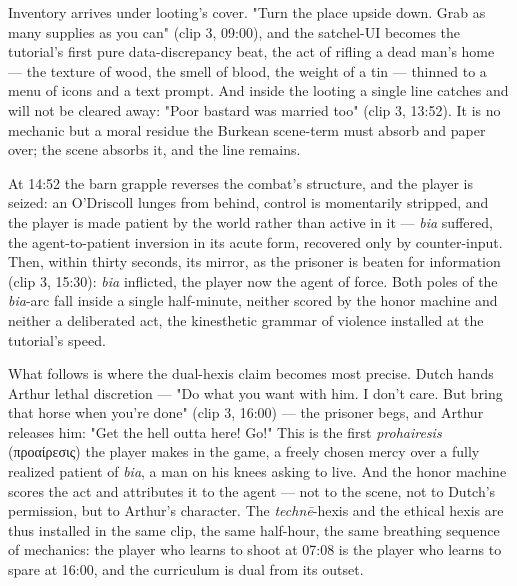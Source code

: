 \documentclass{article}
\newcommand{\gk}[1]{{\greekfont #1}}
\begin{document}
Inventory arrives under looting's cover. "Turn the place upside down. Grab as many supplies as you can" (clip 3, 09:00), and the satchel-UI becomes the tutorial's first pure data-discrepancy beat, the act of rifling a dead man's home — the texture of wood, the smell of blood, the weight of a tin — thinned to a menu of icons and a text prompt. And inside the looting a single line catches and will not be cleared away: "Poor bastard was married too" (clip 3, 13:52). It is no mechanic but a moral residue the Burkean scene-term must absorb and paper over; the scene absorbs it, and the line remains.

At 14:52 the barn grapple reverses the combat's structure, and the player is seized: an O'Driscoll lunges from behind, control is momentarily stripped, and the player is made patient by the world rather than active in it — \textit{bia} suffered, the agent-to-patient inversion in its acute form, recovered only by counter-input. Then, within thirty seconds, its mirror, as the prisoner is beaten for information (clip 3, 15:30): \textit{bia} inflicted, the player now the agent of force. Both poles of the \textit{bia}-arc fall inside a single half-minute, neither scored by the honor machine and neither a deliberated act, the kinesthetic grammar of violence installed at the tutorial's speed.

What follows is where the dual-hexis claim becomes most precise. Dutch hands Arthur lethal discretion — "Do what you want with him. I don't care. But bring that horse when you're done" (clip 3, 16:00) — the prisoner begs, and Arthur releases him: "Get the hell outta here! Go!" This is the first \textit{prohairesis} (\gk{προαίρεσις}) the player makes in the game, a freely chosen mercy over a fully realized patient of \textit{bia}, a man on his knees asking to live. And the honor machine scores the act and attributes it to the agent — not to the scene, not to Dutch's permission, but to Arthur's character. The \textit{technē}-hexis and the ethical hexis are thus installed in the same clip, the same half-hour, the same breathing sequence of mechanics: the player who learns to shoot at 07:08 is the player who learns to spare at 16:00, and the curriculum is dual from its outset.
\end{document}
